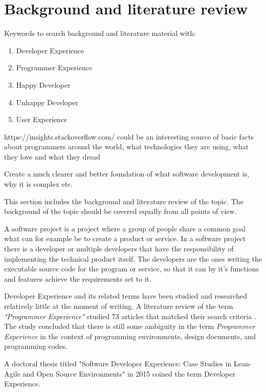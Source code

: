 \documentclass[english, 12pt, a4paper, sci, utf8, a-1b, online]{aaltothesis}
\begin{document}
\section{Background and literature review}
 {
  \color{gray}

  Keywords to search background and literature material with:

  \begin{enumerate}
    \item Developer Experience
    \item Programmer Experience
    \item Happy Developer
    \item Unhappy Developer
    \item User Experience
  \end{enumerate}

  https://insights.stackoverflow.com/ could be an interesting source of basic facts about programmers around the world, what technologies they are using, what they love and what they dread

  Create a much clearer and better foundation of what software development is, why it is complex etc.
 }

This section includes the background and literature review of the topic. The background of the topic should be covered equally from all points of view.

A software project is a project where a group of people share a common goal what can for example be to create a product or service. In a software project there is a developer or multiple developers that have the responsibility of implementing the technical product itself. The developers are the ones writing the executable source code for the program or service, so that it can by it's functions and features achieve the requirements set to it.

Developer Experience and its related terms have been studied and researched relatively little at the moment of writing. A literature review of the term \textit{"Programmer Experience"} studied 73 articles that matched their search criteria \cite{programmer-experience}. The study concluded that there is still some ambiguity in the term \textit{Programmer Experience} in the context of programming environments, design documents, and programming codes.

A doctoral thesis titled "Software Developer Experience:
Case Studies in Lean-Agile and Open Source Environments" in 2015 coined the term Developer Experience.
\end{document}
